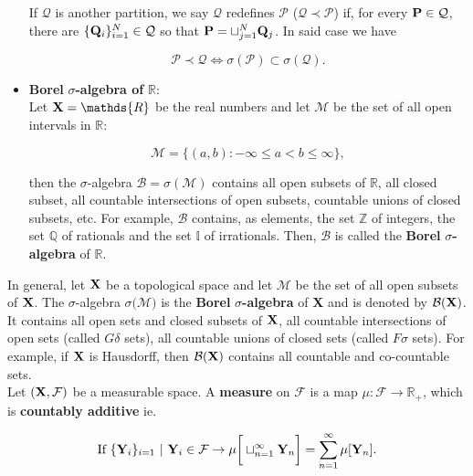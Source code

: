 \documentclass{homework}
\begin{document}
\begin{itemize}
    If $\mathcal{Q}$ is another partition, we say $\mathcal{Q}$ redefines $\mathcal{P}$ ($\mathcal{Q}\prec \mathcal{P}$) if, for every ${\bf P}\in \mathcal{Q}$, there are $\{{\bf Q}_i\}_{i=1}^{N} \in \mathcal{Q}$ so that ${\bf P} = \sqcup_{j=1}^{N} {\bf Q}_{j}$. In said case we have 
    
    $$
    \mathcal{P}\prec \mathcal{Q} \Leftrightarrow \sigma(\mathcal{P}) \subset \sigma(\mathcal{Q}).
    $$ 
    
    \item \textbf{Borel } $\sigma$\textbf{-algebra of } $\mathds{R}$: \\
    
    Let ${\bf X} =\mathds{R}$ be the real numbers and let $\mathcal{M}$ be the set of all open intervals in $\mathds{R}$:
    
    $$
    \mathcal{M} = \{(a,b): -\infty \leq a < b \leq \infty\}, 
    $$
    
    then the $\sigma$-algebra $\mathcal{B} = \sigma(\mathcal{M})$ contains all open subsets of $\mathds{R}$, all closed subset, all countable intersections of open subsets, countable unions of closed subsets, etc. For example, $\mathcal{B}$ contains, as elements, the set $\mathds{Z}$ of integers, the set $\mathds{Q}$ of rationals and the set $\mathds{I}$ of irrationals. Then, $\mathcal{B}$ is called the \textbf{Borel} $\sigma$\textbf{-algebra} of $\mathds{R}$. \\
\end{itemize}

In general, let ${\bf X}$ be a topological space and let $\mathcal{M}$ be the set of all open subsets of ${\bf X}$. The $\sigma$-algebra $\sigma(\mathcal{M)}$ is the \textbf{Borel} $\sigma$\textbf{-algebra} of {\bf X} and is denoted by $\mathcal{B}({\bf X})$. It contains all open sets and closed subsets of ${{\bf X}}$, all countable intersections of open sets (called $G\delta$ sets), all countable unions of closed sets (called $F\sigma$ sets). For example, if ${\bf X}$ is Hausdorff, then $\mathcal{B}({\bf X})$ contains all countable and co-countable sets.\\

Let $({\bf X}, \mathcal{F})$ be a measurable space. A \textbf{measure} on $\mathcal{F}$ is a map $\mu: \mathcal{F} \rightarrow \mathds{R}_{+}$, which is \textbf{countably additive} ie. 

$$
\textnormal{If } \{{\bf Y}_i\}_{i=1} \textnormal{ }| \textnormal{ } {\bf Y}_i \in \mathcal{F} \rightarrow \mu\bigg[\sqcup_{n=1}^{\infty}{\bf Y}_n\bigg] = \sum_{n=1}^{\infty} \mu[{\bf Y}_n].
$$
\end{document}
